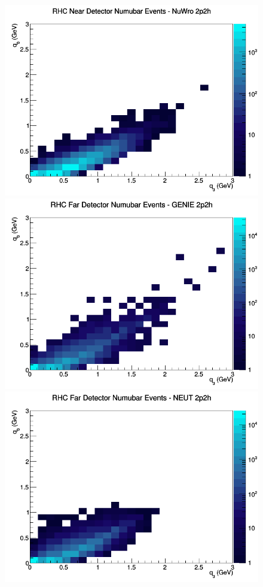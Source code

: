 \documentclass[12pt]{article}
\begin{document}
\begin{figure}[h]
\includegraphics[width=\linewidth]{eff_q0_q3/LAr/2p2h_RHC_ND_numubar_q3_q0_NuWro.png}
\endminipage
\newline
{}
\includegraphics[width=\linewidth]{eff_q0_q3/LAr/2p2h_RHC_FD_numubar_q3_q0_GENIE.png}
\endminipage
{}
\includegraphics[width=\linewidth]{eff_q0_q3/LAr/2p2h_RHC_FD_numubar_q3_q0_NEUT.png}

\end{figure}
\end{document}
